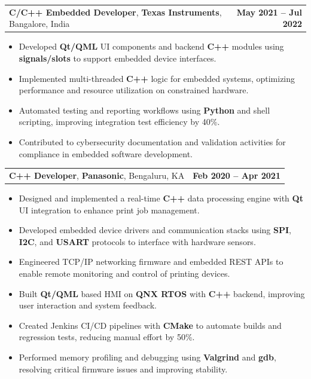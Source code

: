 \documentclass[letterpaper,11pt]{article}
\makeatletter
\newcommand{\resumeItem}[1]{
  \item\footnotesize{
    {#1 \vspace{-2pt}}
  }
}
\newcommand{\resumeSubheading}[4]{
  \vspace{-2pt}\item
    \begin{tabular*}{1.0\textwidth}[t]{l@{\extracolsep{\fill}}r}
      \textbf{\fontsize{10pt}{14pt}\selectfont #3}, \textbf{\fontsize{10pt}{14pt}\selectfont #1}, \fontsize{10pt}{14pt}\selectfont #4 & \textbf{\fontsize{10pt}{14pt}\selectfont #2} \\
    \end{tabular*}\vspace{-7pt}
}
\newcommand{\resumeItemListStart}{\begin{itemize}[leftmargin=*]}
\newcommand{\resumeItemListEnd}{\end{itemize}\vspace{-5pt}}
\makeatother
\begin{document}
    \resumeSubheading
        {Texas Instruments}{May 2021 -- Jul 2022}
        {C/C++ Embedded Developer}{Bangalore, India}
      \resumeItemListStart
        \resumeItem{Developed \textbf{Qt/QML} UI components and backend \textbf{C++} modules using \textbf{signals/slots} to support embedded device interfaces.}
        \resumeItem{Implemented multi-threaded \textbf{C++} logic for embedded systems, optimizing performance and resource utilization on constrained hardware.}
        \resumeItem{Automated testing and reporting workflows using \textbf{Python} and shell scripting, improving integration test efficiency by 40\%.}
        \resumeItem{Contributed to cybersecurity documentation and validation activities for compliance in embedded software development.}
      \resumeItemListEnd

    \resumeSubheading
        {Panasonic}{Feb 2020 -- Apr 2021}
        {C++ Developer}{Bengaluru, KA}
      \resumeItemListStart
        \resumeItem{Designed and implemented a real-time \textbf{C++} data processing engine with \textbf{Qt} UI integration to enhance print job management.}
        \resumeItem{Developed embedded device drivers and communication stacks using \textbf{SPI}, \textbf{I2C}, and \textbf{USART} protocols to interface with hardware sensors.}
        \resumeItem{Engineered TCP/IP networking firmware and embedded REST APIs to enable remote monitoring and control of printing devices.}
        \resumeItem{Built \textbf{Qt/QML} based HMI on \textbf{QNX RTOS} with \textbf{C++} backend, improving user interaction and system feedback.}
        \resumeItem{Created Jenkins CI/CD pipelines with \textbf{CMake} to automate builds and regression tests, reducing manual effort by 50\%.}
        \resumeItem{Performed memory profiling and debugging using \textbf{Valgrind} and \textbf{gdb}, resolving critical firmware issues and improving stability.}
      \resumeItemListEnd
\end{document}
